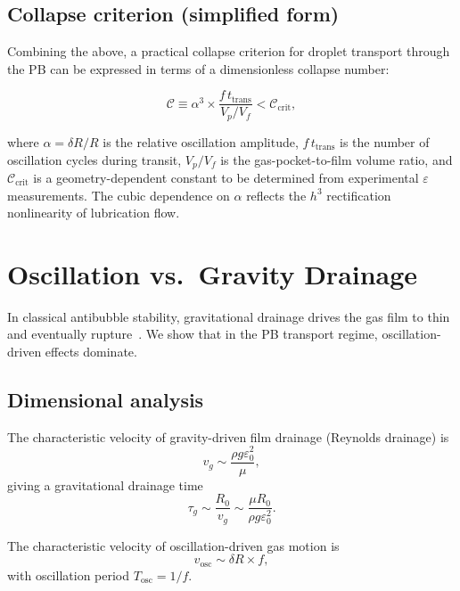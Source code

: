 \documentclass[%
 preprint,
 superscriptaddress,
 amsmath,amssymb,
 aps, prl,
]{revtex4-2}
\begin{document}
\subsection{Collapse criterion (simplified form)}

Combining the above, a practical collapse criterion for droplet transport
through the PB can be expressed in terms of a dimensionless collapse number:

\begin{equation}
\boxed{\mathcal{C} \equiv
\alpha^3 \times \frac{f\,t_{\text{trans}}}{V_p/V_f}
< \mathcal{C}_{\text{crit}},}
\end{equation}

where $\alpha = \delta R/R$ is the relative oscillation amplitude,
$f\,t_{\text{trans}}$ is the number of oscillation cycles during transit,
$V_p/V_f$ is the gas-pocket-to-film volume ratio, and
$\mathcal{C}_{\text{crit}}$ is a geometry-dependent constant to be
determined from experimental $\varepsilon$ measurements.
The cubic dependence on $\alpha$ reflects the $h^3$ rectification
nonlinearity of lubrication flow.

\section{Oscillation vs.\ Gravity Drainage}

In classical antibubble stability, gravitational drainage drives the
gas film to thin and eventually rupture~\cite{Dorbolo2005,Scheid2014}.
We show that in the PB transport regime, oscillation-driven effects
dominate.

\subsection{Dimensional analysis}

The characteristic velocity of gravity-driven film drainage
(Reynolds drainage) is
\begin{equation}
v_g \sim \frac{\rho g \varepsilon_0^2}{\mu},
\end{equation}
giving a gravitational drainage time
\begin{equation}
\tau_g \sim \frac{R_0}{v_g}
\sim \frac{\mu R_0}{\rho g \varepsilon_0^2}.
\end{equation}

The characteristic velocity of oscillation-driven gas motion is
\begin{equation}
v_{\text{osc}} \sim \delta R \times f,
\end{equation}
with oscillation period $T_{\text{osc}} = 1/f$.
\end{document}
